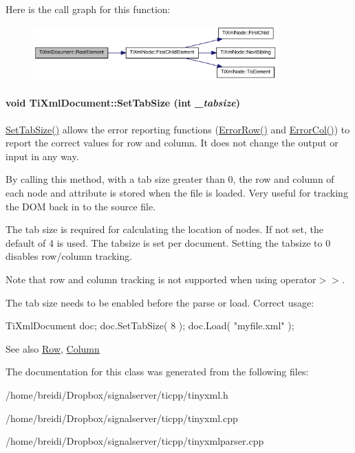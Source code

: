 Here is the call graph for this function:\nopagebreak
\begin{figure}[H]
\begin{center}
\leavevmode
\includegraphics[width=266pt]{class_ti_xml_document_ad09d17927f908f40efb406af2fb873be_cgraph}
\end{center}
\end{figure}
\hypertarget{class_ti_xml_document_a51dac56316f89b35bdb7d0d433ba988e}{
\paragraph[{SetTabSize}]{\setlength{\rightskip}{0pt plus 5cm}void TiXmlDocument::SetTabSize (int {\em \_\-tabsize})}\hfill}
\label{class_ti_xml_document_a51dac56316f89b35bdb7d0d433ba988e}
\hyperlink{class_ti_xml_document_a51dac56316f89b35bdb7d0d433ba988e}{SetTabSize()} allows the error reporting functions (\hyperlink{class_ti_xml_document_af30efc75e804aa2e92fb8be3a8cb676e}{ErrorRow()} and \hyperlink{class_ti_xml_document_aa90bc630ee5203c6109ca5fad3323649}{ErrorCol()}) to report the correct values for row and column. It does not change the output or input in any way.

By calling this method, with a tab size greater than 0, the row and column of each node and attribute is stored when the file is loaded. Very useful for tracking the DOM back in to the source file.

The tab size is required for calculating the location of nodes. If not set, the default of 4 is used. The tabsize is set per document. Setting the tabsize to 0 disables row/column tracking.

Note that row and column tracking is not supported when using operator$>$$>$.

The tab size needs to be enabled before the parse or load. Correct usage: \begin{DoxyVerb}
		TiXmlDocument doc;
		doc.SetTabSize( 8 );
		doc.Load( "myfile.xml" );
		\end{DoxyVerb}


\begin{DoxySeeAlso}{See also}
\hyperlink{class_ti_xml_base_a024bceb070188df92c2a8d8852dd0853}{Row}, \hyperlink{class_ti_xml_base_ab54bfb9b70fe6dd276e7b279cab7f003}{Column} 
\end{DoxySeeAlso}


The documentation for this class was generated from the following files:\begin{DoxyCompactItemize}
\item 
/home/breidi/Dropbox/signalserver/ticpp/tinyxml.h\item 
/home/breidi/Dropbox/signalserver/ticpp/tinyxml.cpp\item 
/home/breidi/Dropbox/signalserver/ticpp/tinyxmlparser.cpp\end{DoxyCompactItemize}
